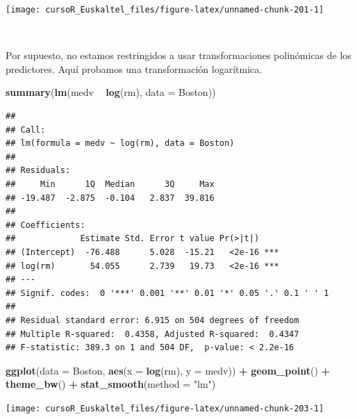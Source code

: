 \documentclass[]{book}
\newenvironment{Shaded}{\begin{snugshade}}{\end{snugshade}}
\newcommand{\KeywordTok}[1]{\textcolor[rgb]{0.13,0.29,0.53}{\textbf{#1}}}
\newcommand{\DataTypeTok}[1]{\textcolor[rgb]{0.13,0.29,0.53}{#1}}
\newcommand{\StringTok}[1]{\textcolor[rgb]{0.31,0.60,0.02}{#1}}
\newcommand{\OperatorTok}[1]{\textcolor[rgb]{0.81,0.36,0.00}{\textbf{#1}}}
\newcommand{\NormalTok}[1]{#1}
\begin{document}
\begin{center}\texttt{[image: cursoR\_Euskaltel\_files/figure-latex/unnamed-chunk-201-1]} \end{center}

~

Por supuesto, no estamos restringidos a usar transformaciones
polinómicas de los predictores. Aquí probamos una transformación
logarítmica.

\begin{Shaded}
\begin{Highlighting}[]
\KeywordTok{summary}\NormalTok{(}\KeywordTok{lm}\NormalTok{(medv }\OperatorTok{~}\StringTok{ }\KeywordTok{log}\NormalTok{(rm), }\DataTypeTok{data =}\NormalTok{ Boston))}
\end{Highlighting}
\end{Shaded}

\begin{verbatim}
## 
## Call:
## lm(formula = medv ~ log(rm), data = Boston)
## 
## Residuals:
##     Min      1Q  Median      3Q     Max 
## -19.487  -2.875  -0.104   2.837  39.816 
## 
## Coefficients:
##             Estimate Std. Error t value Pr(>|t|)    
## (Intercept)  -76.488      5.028  -15.21   <2e-16 ***
## log(rm)       54.055      2.739   19.73   <2e-16 ***
## ---
## Signif. codes:  0 '***' 0.001 '**' 0.01 '*' 0.05 '.' 0.1 ' ' 1
## 
## Residual standard error: 6.915 on 504 degrees of freedom
## Multiple R-squared:  0.4358, Adjusted R-squared:  0.4347 
## F-statistic: 389.3 on 1 and 504 DF,  p-value: < 2.2e-16
\end{verbatim}

\begin{Shaded}
\begin{Highlighting}[]
\KeywordTok{ggplot}\NormalTok{(}\DataTypeTok{data =}\NormalTok{ Boston, }\KeywordTok{aes}\NormalTok{(}\DataTypeTok{x =} \KeywordTok{log}\NormalTok{(rm), }\DataTypeTok{y =}\NormalTok{ medv)) }\OperatorTok{+}
\StringTok{  }\KeywordTok{geom_point}\NormalTok{() }\OperatorTok{+}
\StringTok{  }\KeywordTok{theme_bw}\NormalTok{() }\OperatorTok{+}\StringTok{ }
\StringTok{  }\KeywordTok{stat_smooth}\NormalTok{(}\DataTypeTok{method =} \StringTok{"lm"}\NormalTok{)}
\end{Highlighting}
\end{Shaded}

\begin{center}\texttt{[image: cursoR\_Euskaltel\_files/figure-latex/unnamed-chunk-203-1]} \end{center}
\end{document}

